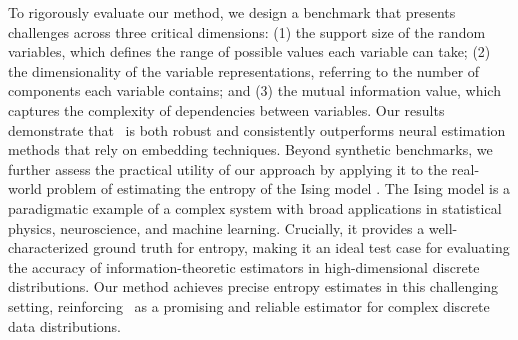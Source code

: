To rigorously evaluate our method, we design a benchmark that presents challenges across three critical dimensions: (1) the support size of the random variables, which defines the range of possible values each variable can take; (2) the dimensionality of the variable representations, referring to the number of components each variable contains; and (3) the mutual information value, which captures the complexity of dependencies between variables. Our results demonstrate that \infosedd\ is both robust and consistently outperforms neural estimation methods that rely on embedding techniques.
Beyond synthetic benchmarks, we further assess the practical utility of our approach by applying it to the real-world problem of estimating the entropy of the Ising model \citep{onsager1944crystal}. The Ising model is a paradigmatic example of a complex system with broad applications in statistical physics, neuroscience, and machine learning. Crucially, it provides a well-characterized ground truth for entropy, making it an ideal test case for evaluating the accuracy of information-theoretic estimators in high-dimensional discrete distributions.%
Our method achieves precise entropy estimates in this challenging setting, reinforcing \infosedd\ as a promising and reliable estimator for complex discrete data distributions.


